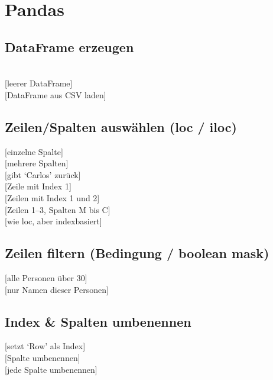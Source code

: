 \section{Pandas}\label{sec:07-pandas}

\subsection{DataFrame erzeugen}\label{sec:07-dataframe-erzeugen}
\begin{contentbox}
\\
[leerer DataFrame]\\
[DataFrame aus CSV laden]
\end{contentbox}

\subsection{Zeilen/Spalten auswählen (loc / iloc)}\label{sec:07-auswaehlen}
\begin{contentbox}
[einzelne Spalte]\\
[mehrere Spalten]\\
[gibt `Carlos' zurück]\\
\ZSFgapS
{}[Zeile mit Index 1]\\
[Zeilen mit Index 1 und 2]\\
[Zeilen 1--3, Spalten M bis C]\\
[wie loc, aber indexbasiert]
\end{contentbox}

\subsection{Zeilen filtern (Bedingung / boolean mask)}\label{sec:07-filtern-von-zeilen}
\begin{contentbox}
[alle Personen über 30]\\
[nur Namen dieser Personen]
\end{contentbox}

\subsection{Index \& Spalten umbenennen}\label{sec:07-spalten-umbenennen}
\begin{contentbox}
[setzt `Row' als Index]\\
[Spalte umbenennen]\\
[jede Spalte umbenennen] %
\end{contentbox}

